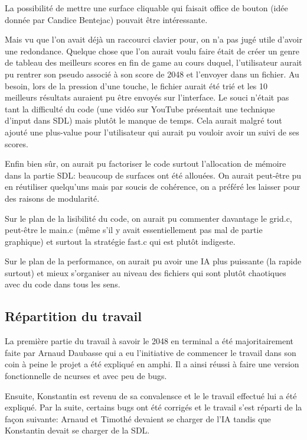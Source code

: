 \documentclass{article}
\begin{document}
La possibilité de mettre une surface cliquable qui faisait office de bouton (idée donnée par Candice Bentejac) pouvait être intéressante.

Mais vu que l'on avait déjà un raccourci clavier pour, on n'a pas jugé utile d'avoir une redondance. 
Quelque chose que l'on aurait voulu faire était de créer un genre de tableau des meilleurs scores en fin de game au cours duquel, l'utilisateur aurait pu rentrer son pseudo associé à son score de 2048 et l'envoyer dans un fichier. Au besoin, lors de la pression d'une touche, le fichier aurait été trié et les 10 meilleurs résultats auraient pu être envoyés sur l'interface. Le souci n'était pas tant la difficulté du code (une vidéo sur YouTube présentait une technique d'input dans SDL) mais plutôt le manque de temps. Cela aurait malgré tout ajouté une plus-value pour l'utilisateur qui aurait pu vouloir avoir un suivi de ses scores.

Enfin bien sûr, on aurait pu factoriser le code surtout l'allocation de mémoire dans la partie SDL: beaucoup de surfaces ont été allouées. On aurait peut-être pu en réutiliser quelqu'uns mais par soucis de cohérence, on a préféré les laisser pour des raisons de modularité.

Sur le plan de la lisibilité du code, on aurait pu commenter davantage le grid.c, peut-être le main.c (même s'il y avait essentiellement pas mal de partie graphique) et surtout la stratégie fast.c qui est plutôt indigeste.

Sur le plan de la performance, on aurait pu avoir une IA plus puissante (la rapide surtout) et mieux s'organiser au niveau des fichiers qui sont plutôt chaotiques avec du code dans tous les sens.

\subsection{Répartition du travail}
La première partie du travail à savoir le 2048 en terminal a été majoritairement faite par Arnaud Daubasse qui a eu l'initiative de commencer le travail dans son coin à peine le projet a été expliqué en amphi. Il a ainsi réussi à faire une version fonctionnelle de ncurses et avec peu de bugs.

Ensuite, Konstantin est revenu de sa convalensce et le le travail effectué lui a été expliqué. Par la suite, certains bugs ont été corrigés et le travail s'est réparti de la façon suivante: Arnaud et Timothé devaient se charger de l'IA tandis que Konstantin devait se charger de la SDL.
\end{document}

